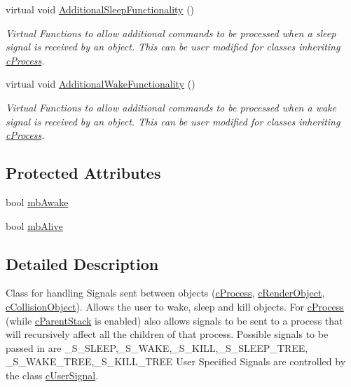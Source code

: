 \begin{DoxyCompactItemize}
virtual void \hyperlink{classc_signal_a0943743d387620716dc6f183d605f08d}{AdditionalSleepFunctionality} ()
\begin{DoxyCompactList}\small\item\em Virtual Functions to allow additional commands to be processed when a sleep signal is received by an object. This can be user modified for classes inheriting \hyperlink{classc_process}{cProcess}. \item\end{DoxyCompactList}\item 
virtual void \hyperlink{classc_signal_a26071844c0570b95a49c4b17974a6ae7}{AdditionalWakeFunctionality} ()
\begin{DoxyCompactList}\small\item\em Virtual Functions to allow additional commands to be processed when a wake signal is received by an object. This can be user modified for classes inheriting \hyperlink{classc_process}{cProcess}. \item\end{DoxyCompactList}\end{DoxyCompactItemize}
\subsection*{Protected Attributes}
\begin{DoxyCompactItemize}
\item 
bool \hyperlink{classc_signal_a25c364b54cb364ed6e96366a3e06cf73}{mbAwake}
\item 
bool \hyperlink{classc_signal_a81f676eca534ecd98897fd9ec5d4ce7c}{mbAlive}
\end{DoxyCompactItemize}


\subsection{Detailed Description}
Class for handling Signals sent between objects (\hyperlink{classc_process}{cProcess}, \hyperlink{classc_render_object}{cRenderObject}, \hyperlink{classc_collision_object}{cCollisionObject}). Allows the user to wake, sleep and kill objects. For \hyperlink{classc_process}{cProcess} (while \hyperlink{classc_parent_stack}{cParentStack} is enabled) also allows signals to be sent to a process that will recursively affect all the children of that process. Possible signals to be passed in are \_\-S\_\-SLEEP,\_\-S\_\-WAKE,\_\-S\_\-KILL,\_\-S\_\-SLEEP\_\-TREE, \_\-S\_\-WAKE\_\-TREE,\_\-S\_\-KILL\_\-TREE User Specified Signals are controlled by the class \hyperlink{classc_user_signal}{cUserSignal}. 

